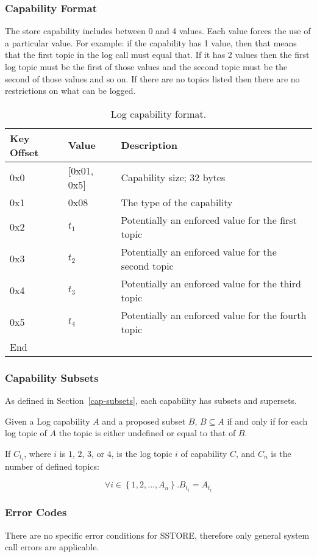 \documentclass[english,a4paper]{article}
\let\oldparagraph\subsubsection
\renewcommand{\subsubsection}[1]{\oldparagraph{#1}\mbox{}}
\begin{document}
\subsubsection{Capability Format}
The store capability includes between 0 and 4 values. Each value forces the use
of a particular value. For example: if the capability has 1 value, then that
means that the first topic in the log call must equal that. If it has 2 values
then the first log topic must be the first of those values and the second topic
must be the second of those values and so on. If there are no topics listed then
there are no restrictions on what can be logged.

\begin{table}[H]
  \caption{Log capability format.}
  \centering{}%
  \begin{tabular}{l|l|p{}}
    \hline
    Key Offset & Value & Description\tabularnewline
    \hline
    \hline
    0x0 & [0x01, 0x5] & Capability size; 32 bytes \tabularnewline
    0x1 & 0x08 & The type of the capability \tabularnewline
    0x2 & $t_1$ & Potentially an enforced value for the first topic
      \tabularnewline
    0x3 & $t_2$ & Potentially an enforced value for the second topic
      \tabularnewline
    0x4 & $t_3$ & Potentially an enforced value for the third topic
      \tabularnewline
    0x5 & $t_4$ & Potentially an enforced value for the fourth topic
      \tabularnewline
    \hline
    End &  \tabularnewline
    \hline
  \end{tabular}
\end{table}

\subsubsection{Capability Subsets}
As defined in Section~\ref{cap-subsets}, each capability has subsets and
supersets.

Given a Log capability $A$ and a proposed subset $B$, $B \subseteq A$ if and
only if for each log topic of $A$ the topic is either undefined or equal to that
of $B$.

If $C_{t_i}$, where $i$ is $1$, $2$, $3$, or $4$, is the log topic $i$ of
capability $C$, and $C_n$ is the number of defined topics:

$$ \forall i \in \left\{1,2,\dots ,A_n\right\}. B_{t_i} = A_{t_i} $$

\subsubsection{Error Codes}
There are no specific error conditions for SSTORE, therefore only general system
call errors are applicable.
\end{document}
